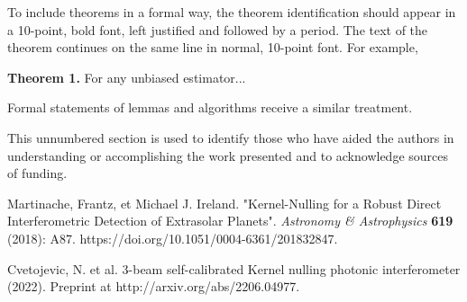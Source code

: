 \documentclass[]{spie}  %
\begin{document}
To include theorems in a formal way, the theorem identification should appear in a 10-point, bold font, left justified and followed by a period.  The text of the theorem continues on the same line in normal, 10-point font.  For example, 

\noindent\textbf{Theorem 1.} For any unbiased estimator...

Formal statements of lemmas and algorithms receive a similar treatment.

\acknowledgments %
 
This unnumbered section is used to identify those who have aided the authors in understanding or accomplishing the work presented and to acknowledge sources of funding.  

\begin{thebibliography}{60}

      Martinache, Frantz, et Michael J. Ireland. "Kernel-Nulling for a Robust Direct Interferometric Detection of Extrasolar Planets". {\it Astronomy \& Astrophysics} \textbf{619} (2018): A87. https://doi.org/10.1051/0004-6361/201832847.
    
    
     Cvetojevic, N. et al. 3-beam self-calibrated Kernel nulling photonic interferometer (2022). Preprint at http://arxiv.org/abs/2206.04977.
    
\end{thebibliography}

\end{document}

